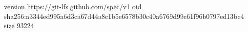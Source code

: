 version https://git-lfs.github.com/spec/v1
oid sha256:a3344ed995a6d3ca67d44a8c1b5e6578b30c40a6769d99e61f96b0797ed13bc4
size 93224
